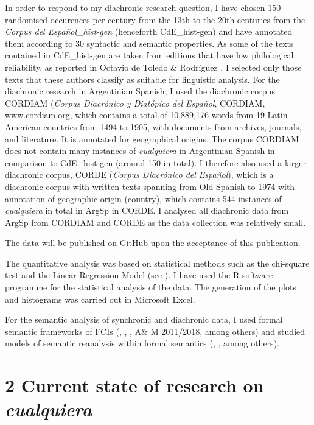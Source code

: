   In order to respond to my diachronic research question, I have chosen 150 randomised occurences per century from the 13th to the 20th centuries from the \textit{Corpus del Español\_hist-gen} (henceforth CdE\_hist-gen) and have annotated them according to 30 syntactic and semantic properties. As some of the texts contained in CdE\_hist-gen are taken from editions that have low philological reliability, as reported in Octavio de Toledo \& Rodríguez \citet{Molina2017}, I selected only those texts that these authors classify as suitable for linguistic analysis. For the diachronic research in Argentinian Spanish, I used the diachronic corpus CORDIAM (\textit{Corpus Diacrónico y Diatópico del Español}, CORDIAM, www.cordiam.org, which contains a total of 10,889,176 words from 19 Latin-American countries from 1494 to 1905, with documents from archives, journals, and literature. It is annotated for geographical origins. The corpus CORDIAM does not contain many instances of \textit{cualquiera} in Argentinian Spanish in comparison to CdE\_hist-gen (around 150 in total). I therefore also used a larger diachronic corpus, CORDE (\textit{Corpus Diacrónico del Español}), which is a diachronic corpus with written texts spanning from Old Spanish to 1974 with annotation of geographic origin (country), which contains 544 instances of \textit{cualquiera} in total in ArgSp in CORDE. I analysed all diachronic data from ArgSp from CORDIAM and CORDE as the data collection was relatively small. 

  The data will be published on GitHub upon the acceptance of this publication.

  The quantitative analysis was based on statistical methods such as the chi-square test and the Linear Regression Model (see \citealt{Baayen2006}). I have used the R software programme for the statistical analysis of the data. The generation of the plots and histograms was carried out in Microsoft Excel. 

  For the semantic analysis of synchronic and diachronic data, I used formal semantic frameworks of FCIs (\citealt{Chierchia2006}, \citealt{Aloni2021}, \citealt{AloniPort2013}, A\& M 2011/2018, among others) and studied models of semantic reanalysis within formal semantics (\citealt{Eckardt2006}, \citealt{AloniPort2013}, among others).

\chapter{\textbf{2} \textbf{Current} \textbf{state} \textbf{of} \textbf{research} \textbf{on} \textbf{\textit{cualquiera}}}

